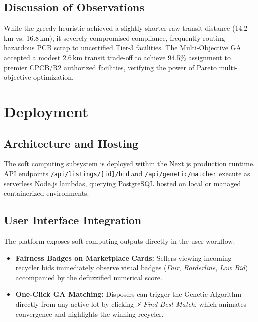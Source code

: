 \documentclass[12pt,a4paper]{article}
\begin{document}
\subsection{Discussion of Observations}
While the greedy heuristic achieved a slightly shorter raw transit distance (14.2\,km vs. 16.8\,km), it severely compromised compliance, frequently routing hazardous PCB scrap to uncertified Tier-3 facilities. The Multi-Objective GA accepted a modest 2.6\,km transit trade-off to achieve 94.5\% assignment to premier CPCB/R2 authorized facilities, verifying the power of Pareto multi-objective optimization.

\section{Deployment}

\subsection{Architecture and Hosting}
The soft computing subsystem is deployed within the Next.js production runtime. API endpoints \texttt{/api/listings/[id]/bid} and \texttt{/api/genetic/matcher} execute as serverless Node.js lambdas, querying PostgreSQL hosted on local or managed containerized environments.

\subsection{User Interface Integration}
The platform exposes soft computing outputs directly in the user workflow:
\begin{itemize}
    \item \textbf{Fairness Badges on Marketplace Cards:} Sellers viewing incoming recycler bids immediately observe visual badges (\textit{Fair}, \textit{Borderline}, \textit{Low Bid}) accompanied by the defuzzified numerical score.
    \item \textbf{One-Click GA Matching:} Disposers can trigger the Genetic Algorithm directly from any active lot by clicking \textit{⚡ Find Best Match}, which animates convergence and highlights the winning recycler.
\end{itemize}

\end{document}
